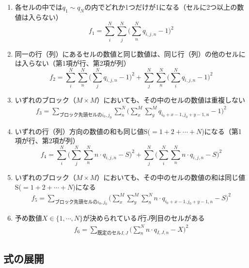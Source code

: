\documentclass[uplatex,dvipdfmx,a4paper,11pt,oneside,openany]{jsbook}
\begin{document}
\begin{enumerate}
\item 各セルの中では$q_1\sim q_N$の内でどれか1つだけが1になる（セルに2つ以上の数値は入らない）
\begin{equation*}
  f_1 = \sum_i^N\sum_j^N\bigg(\sum_n^N q_{i,j,n} - 1\bigg)^2
\end{equation*}
\item 同一の行（列）にあるセルの数値と同じ数値は、同じ行（列）の他のセルには入らない（第1項が行、第2項が列）
\begin{equation*}
  f_2 = \sum_i^N\sum_n^N\bigg(\sum_j^N q_{i,j,n} - 1\bigg)^2 + \sum_j^N\sum_n^N\bigg(\sum_i^N q_{i,j,n} - 1\bigg)^2
\end{equation*}
\item いずれのブロック（$M\times M$）においても、その中のセルの数値は重複しない
\begin{eqnarray*}
  f_3 = \sum_{ブロック先頭セルのi_0,j_0}\sum_n^N\bigg(\sum_x^M\sum_y^M q_{i_0+x-1,j_0+y-1,n} - 1\bigg)^2
\end{eqnarray*}
\item いずれの行（列）方向の数値の和も同じ値S($=1+2+\cdots +N$)になる（第1項が行、第2項が列）
\begin{equation*}
  f_4 = \sum_i^N\bigg(\sum_j^N\sum_n^N n \cdot q_{i,j,n} - S\bigg)^2 + \sum_j^N\bigg(\sum_i^N\sum_n^N n \cdot q_{i,j,n} - S\bigg)^2
\end{equation*}
\item いずれのブロック（$M\times M$）においても、その中のセルの数値の和は同じ値S($=1+2+\cdots +N$)になる
\begin{eqnarray*}
  f_5 = \sum_{ブロック先頭セルのi_0,j_0}\bigg(\sum_x^M\sum_y^M\sum_n^N n \cdot q_{i_0+x-1,j_0+y-1,n} - S\bigg)^2
\end{eqnarray*}
\item 予め数値$X\in\{1,\cdots,N\}$が決められている$I$行$J$列目のセルがある
\begin{eqnarray*}
  f_6 = \sum_{既定のセルI,J}\bigg(\sum_n^N n \cdot q_{I,J,n} - X\bigg)^2
\end{eqnarray*}
\end{enumerate}

\subsection{式の展開}
\end{document}
